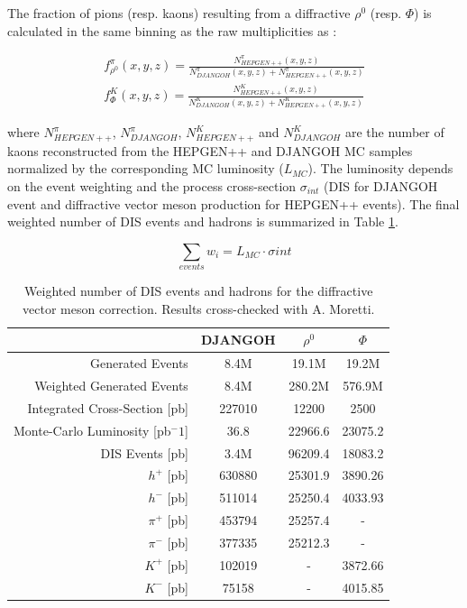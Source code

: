 \documentclass[letterpaper,12pt]{article}
\begin{document}
The fraction of pions (resp. kaons) resulting from a diffractive $\rho^0$ (resp. $\Phi$) is calculated in the same binning as the raw multiplicities as :

\begin{equation}
  \begin{split}
    f^{\pi}_{\rho^0}(x,y,z) = \frac{N^{\pi}_{HEPGEN++}(x,y,z)}{N^{\pi}_{DJANGOH}(x,y,z)+N^{\pi}_{HEPGEN++}(x,y,z)} \\
    f^K_{\Phi}(x,y,z) = \frac{N^K_{HEPGEN++}(x,y,z)}{N^K_{DJANGOH}(x,y,z)+N^K_{HEPGEN++}(x,y,z)}
  \end{split}
\end{equation}

where $N^{\pi}_{HEPGEN++}$, $N^{\pi}_{DJANGOH}$, $N^K_{HEPGEN++}$ and $N^K_{DJANGOH}$ are the number of kaons reconstructed from the HEPGEN++ and DJANGOH MC samples normalized by the corresponding
MC luminosity ($L_{MC}$). The luminosity depends on the event weighting and the process cross-section $\sigma_{int}$ (DIS for DJANGOH event and diffractive
vector meson production for HEPGEN++ events). The final weighted number of DIS events and hadrons is summarized in Table \ref{DVM}.

\begin{equation}
  \sum_{events} w_i = L_{MC} \cdot \sigma{int}
\end{equation}

\begin{table}
	\centering
	\begin{tabular}{rccc}
    \hline
     & DJANGOH & $\rho^0$ & $\Phi$ \\
    \hline
    Generated Events & 8.4M & 19.1M & 19.2M  \\
    Weighted Generated Events & 8.4M & 280.2M & 576.9M  \\
		Integrated Cross-Section [pb] & 227010 & 12200 & 2500  \\
		Monte-Carlo Luminosity [pb$^-1$] & 36.8 & 22966.6 & 23075.2  \\
    \hline
		DIS Events [pb] & 3.4M & 96209.4 & 18083.2  \\
		$h^+$ [pb] & 630880 & 25301.9 & 3890.26  \\
		$h^-$ [pb] & 511014 & 25250.4 & 4033.93  \\
		$\pi^+$ [pb] & 453794 & 25257.4 & -  \\
		$\pi^-$ [pb] & 377335 & 25212.3 & -  \\
		$K^+$ [pb] & 102019 & - & 3872.66  \\
		$K^-$ [pb] & 75158 & - & 4015.85 \\
  \end{tabular}
  \caption{Weighted number of DIS events and hadrons for the diffractive vector meson correction. Results cross-checked with A. Moretti.}
  \label{DVM}
\end{table}
\end{document}
